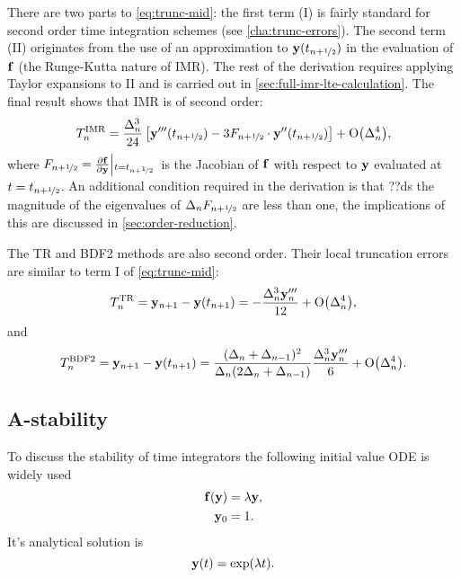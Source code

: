 There are two parts to \cref{eq:trunc-mid}: the first term (I) is fairly standard for second order time integration schemes (see \eg \cref{cha:trunc-errors}).
The second term (II) originates from the use of an approximation to $\mathbf{y}(t_{n+\nicefrac{1}{2}})$ in the evaluation of ${\mathbf{f}}$ (\ie the Runge-Kutta nature of IMR).
The rest of the derivation requires applying Taylor expansions to II and is carried out in \cref{sec:full-imr-lte-calculation}.
The final result shows that IMR is of second order:
\begin{equation}
  \lte^\imr = \frac{\dtn^3}{24} \left[\yvhf['''] - 3 \dfdyhf \cdot \yvhf[''] \right]
  + \order{\dtn^4},
  \label{eq:trunc-final}
\end{equation}
where $F_{n+\nicefrac{1}{2}} = \frac{\partial {\mathbf{f}}}{\partial \mathbf{y}}{\left|_{t=t_{n+\nicefrac{1}{2}}}\right.}$ is the Jacobian of ${\mathbf{f}}$ with respect to $\mathbf{y}$ evaluated at $t=t_{n+\nicefrac{1}{2}}$.
An additional condition required in the derivation is that ??ds the magnitude of the eigenvalues of $\Delta_{n}F_{n+\nicefrac{1}{2}}$ are less than one, the implications of this are discussed in \cref{sec:order-reduction}.

The TR \cite[261]{GreshoSani} and BDF2 \cite[715]{GreshoSani} methods are also second order.
Their local truncation errors are similar to term I of \cref{eq:trunc-mid}:
\begin{equation}
  \label{eq:tr-lte}
  \lte^\tr = \yv_{n+1} - \yv(t_{n+1}) = -\frac{\dtn^3 \yv_n'''}{12}
  + \order{\dtn^4},
\end{equation}
and
\begin{equation}
  \label{eq:bdf2-lte}
  \lte^\bdf = \yv_{n+1} - \yv(t_{n+1}) = \frac{(\dtn + \dtx{n-1})^2}{\dtn(2\dtn + \dtx{n-1})}
  \frac{\dtn^3 \yv_n'''}{6}
  + \order{\dtn^4}.
\end{equation}


\subsection{A-stability}
\label{sec:A-stability}

To discuss the stability of time integrators the following initial value ODE is widely used
\begin{equation}
  \begin{aligned}
    \ffv{\yv} &= \lambda \yv, \\
    \yv_0 &= 1.
    \label{eq:ode-test-f}
  \end{aligned} 
\end{equation}
It's analytical solution is
\begin{equation}
  \mathbf{y}(t) = \exp(\lambda t).
\end{equation}

